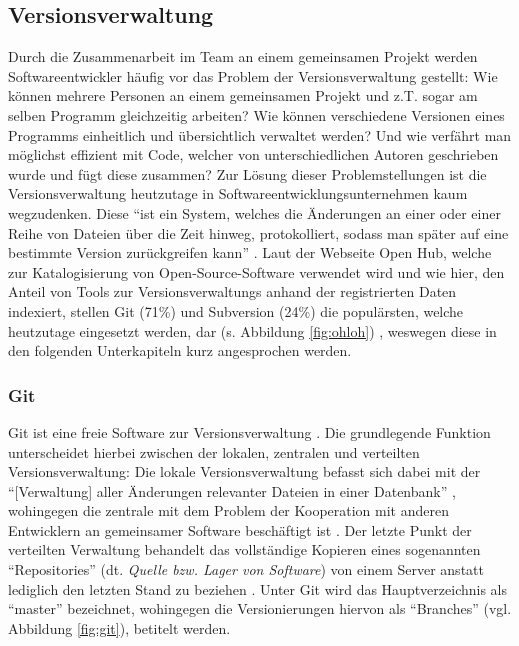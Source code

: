 \subsection{Versionsverwaltung}
Durch die Zusammenarbeit im Team an einem gemeinsamen Projekt werden Softwareentwickler häufig vor das Problem der Versionsverwaltung gestellt: Wie können mehrere Personen an einem gemeinsamen Projekt und z.T. sogar am selben Programm gleichzeitig arbeiten?
Wie können verschiedene Versionen eines Programms einheitlich und übersichtlich verwaltet werden? Und wie verfährt man möglichst effizient mit Code, welcher von unterschiedlichen Autoren geschrieben wurde und fügt diese zusammen? \newline Zur Lösung dieser Problemstellungen 
ist die Versionsverwaltung heutzutage in Softwareentwicklungsunternehmen kaum wegzudenken. Diese \enquote{ist ein System, welches die Änderungen an einer oder einer Reihe von Dateien über die Zeit hinweg, protokolliert, sodass man später auf eine bestimmte Version 
zurückgreifen kann} \cite{Scott-Chacon:2020aa}. \newline \newline Laut der Webseite Open Hub, welche zur Katalogisierung von Open-Source-Software verwendet wird und wie hier, den Anteil von Tools zur Versionsverwaltungs anhand der registrierten Daten indexiert, stellen Git (71\%) 
und Subversion (24\%) die populärsten, welche heutzutage eingesetzt werden, dar (s. Abbildung \ref{fig:ohloh}) \cite{Inc.:2020aa}, weswegen diese in den folgenden Unterkapiteln kurz angesprochen werden.

\subsubsection{Git} \label{git}
Git ist eine freie Software zur Versionsverwaltung \cite{Git:2020aa}. Die grundlegende Funktion unterscheidet hierbei zwischen der lokalen, zentralen und verteilten Versionsverwaltung: Die lokale Versionsverwaltung befasst sich dabei mit der \enquote{[Verwaltung] aller Änderungen relevanter Dateien in einer Datenbank} \cite{Scott-Chacon:2020aa}, wohingegen die
zentrale mit dem Problem der Kooperation mit anderen Entwicklern an gemeinsamer Software beschäftigt ist \cite{Scott-Chacon:2020aa}. Der letzte Punkt der verteilten Verwaltung behandelt das vollständige Kopieren eines sogenannten \enquote{Repositories} (dt. \textit{Quelle bzw. Lager von Software})
von einem Server anstatt lediglich den letzten Stand zu beziehen \cite{Scott-Chacon:2020aa}. Unter Git wird das Hauptverzeichnis als \enquote{master} bezeichnet, wohingegen die Versionierungen hiervon als \enquote{Branches} (vgl. Abbildung \ref{fig:git}), betitelt werden.

